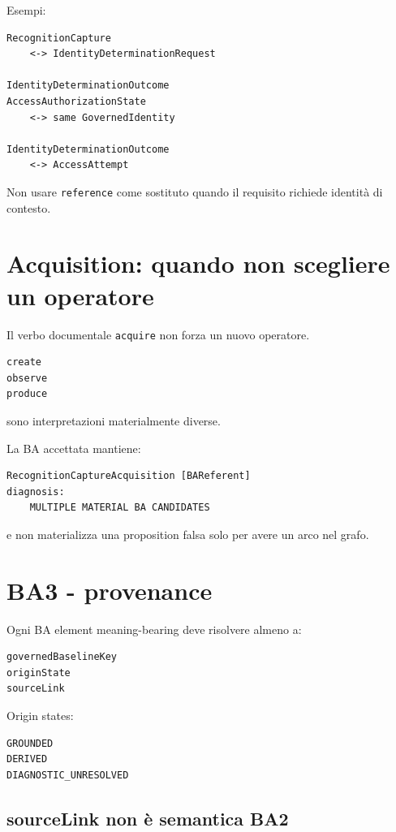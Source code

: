 \documentclass[11pt,a4paper]{article}
\newcommand{\code}[1]{\nolinkurl{#1}}
\begin{document}
Esempi:

\begin{lstlisting}
RecognitionCapture
    <-> IdentityDeterminationRequest

IdentityDeterminationOutcome
AccessAuthorizationState
    <-> same GovernedIdentity

IdentityDeterminationOutcome
    <-> AccessAttempt
\end{lstlisting}

Non usare \code{reference} come sostituto quando il requisito richiede identità di contesto.

\section{Acquisition: quando non scegliere un operatore}

Il verbo documentale \code{acquire} non forza un nuovo operatore.

\begin{lstlisting}
create
observe
produce
\end{lstlisting}

sono interpretazioni materialmente diverse.

La BA accettata mantiene:

\begin{lstlisting}
RecognitionCaptureAcquisition [BAReferent]
diagnosis:
    MULTIPLE MATERIAL BA CANDIDATES
\end{lstlisting}

e non materializza una proposition falsa solo per avere un arco nel grafo.

\section{BA3 - provenance}

Ogni BA element meaning-bearing deve risolvere almeno a:

\begin{lstlisting}
governedBaselineKey
originState
sourceLink
\end{lstlisting}

Origin states:

\begin{lstlisting}
GROUNDED
DERIVED
DIAGNOSTIC_UNRESOLVED
\end{lstlisting}

\subsection{sourceLink non è semantica BA2}
\end{document}
